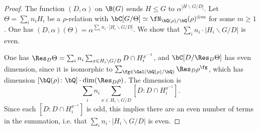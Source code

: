 \begin{proof}
    The function $(D, \alpha)$ on $\B(G)$ sends $H \leq G$ to $\alpha^{| H \backslash G / D|}$. Let $\Theta = \sum_i n_i H_i$ be a $\rho$-relation with $\bC[G / \Theta] \simeq \repnorm{\rho}^{\oplus m}$ for some $m \geq 1$. One has $(D, \alpha)(\Theta) = \alpha^{\sum_i n_i \cdot | H_i \backslash G / D|}$. We show that $\sum_i n_i \cdot | H_i \backslash G / D |$ is even.

    One has $\Res_D \Theta = \sum_i n_i \sum_{x \in H_i \backslash G / D} D \cap H_i^{x^{-1}}$, and $\bC[D / \Res_D \Theta]$ has even dimension, since it is isomorphic to $\sum_{\fg \in \Gal(\bQ(\rho) / \bQ)} \Res_D \rho^{\fg}$, which has dimension $[\bQ(\rho) \colon \bQ]\cdot \dim(\Res_D \rho)$. The dimension is $$\sum_i n_i \sum_{x \in H_i \backslash G / D} [D : D \cap H_i^{x^{-1}} ].$$ Since each $[D : D \cap H_i^{x^{-1}} ]$ is odd, this implies there are an even number of terms in the summation, i.e. that $\sum_i n_i \cdot | H_i \backslash G / D|$ is even. 

\end{proof}





